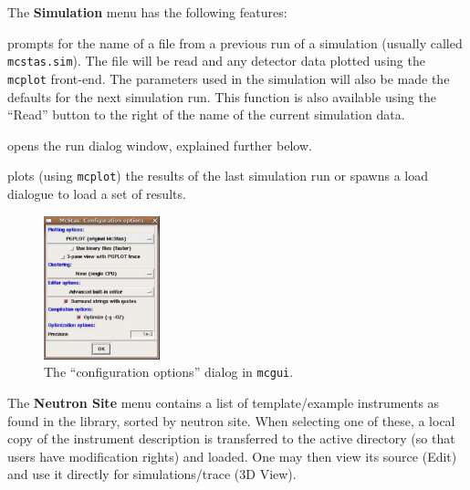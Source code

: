 \noindent The \textbf{Simulation} menu has the following features:
\begin{description}
\item[Simulation/Read old simulation] prompts for the name of a file
  from a previous run of a \MCS simulation (usually called
  \verb+mcstas.sim+). The file will be read and any detector data
  plotted using the \verb+mcplot+ front-end. The parameters used in the
  simulation will also be made the defaults for the next simulation
  run. This function is also available using the ``Read'' button to the
  right of the name of the current simulation data.
\item[Simulation/Run simulation] opens the run dialog window, explained
  further below.
\item[Simulation/Plot results] plots (using \verb+mcplot+) the results of the
  last simulation run or spawns a load dialogue to load a set of results.
\end{description}


\begin{figure}[htb!]
  \begin{center}
    \includegraphics[width=0.3\textwidth]{figures/choose_backend}
  \end{center}
\caption{The ``configuration options'' dialog in \texttt{mcgui}.}
\label{fig:mcgui-choose}
\end{figure}


\noindent The \textbf{Neutron Site} menu contains a list of template/example
instruments as found in the \MCS library, sorted by neutron site. When
selecting one of these, a local copy of the instrument description is
transferred to the active directory (so that users have modification rights) and
loaded. One may then view its source (Edit) and use it directly for
simulations/trace (3D View).
\\\ \\

